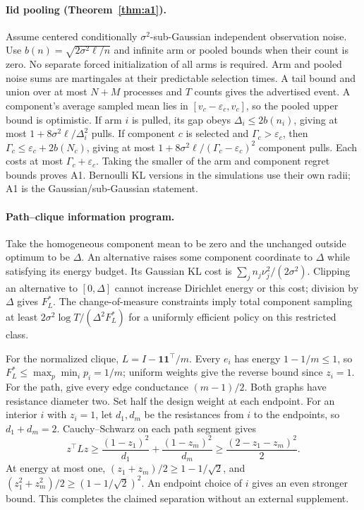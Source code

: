 \documentclass[sigconf,review,anonymous]{acmart}
\begin{document}
\paragraph{Iid pooling (Theorem~\ref{thm:a1}).}
Assume centered conditionally $\sigma^2$-sub-Gaussian independent observation noise. Use $b(n)=\sqrt{2\sigma^2\ell/n}$ and infinite arm or pooled bounds when their count is zero. No separate forced initialization of all arms is required. Arm and pooled noise sums are martingales at their predictable selection times. A tail bound and union over at most $N+M$ processes and $T$ counts gives the advertised event. A component's average sampled mean lies in $[v_c-\varepsilon_c,v_c]$, so the pooled upper bound is optimistic. If arm $i$ is pulled, its gap obeys $\Delta_i\le2b(n_i)$, giving at most $1+8\sigma^2\ell/\Delta_i^2$ pulls. If component $c$ is selected and $\Gamma_c>\varepsilon_c$, then $\Gamma_c\le\varepsilon_c+2b(N_c)$, giving at most $1+8\sigma^2\ell/(\Gamma_c-\varepsilon_c)^2$ component pulls. Each costs at most $\Gamma_c+\varepsilon_c$. Taking the smaller of the arm and component regret bounds proves A1. Bernoulli KL versions in the simulations use their own radii; A1 is the Gaussian/sub-Gaussian statement.

\paragraph{Path--clique information program.}
Take the homogeneous component mean to be zero and the unchanged outside optimum to be $\Delta$. An alternative raises some component coordinate to $\Delta$ while satisfying its energy budget. Its Gaussian KL cost is $\sum_j n_j\nu_j^2/(2\sigma^2)$. Clipping an alternative to $[0,\Delta]$ cannot increase Dirichlet energy or this cost; division by $\Delta$ gives $F_L^*$. The change-of-measure constraints imply total component sampling at least $2\sigma^2\log T/(\Delta^2F_L^*)$ for a uniformly efficient policy on this restricted class.

For the normalized clique, $L=I-\mathbf1\mathbf1^\top/m$. Every $e_i$ has energy $1-1/m\le1$, so $F_L^*\le\max_p\min_i p_i=1/m$; uniform weights give the reverse bound since $z_i=1$. For the path, give every edge conductance $(m-1)/2$. Both graphs have resistance diameter two. Set half the design weight at each endpoint. For an interior $i$ with $z_i=1$, let $d_1,d_m$ be the resistances from $i$ to the endpoints, so $d_1+d_m=2$. Cauchy--Schwarz on each path segment gives
\[
z^\top Lz\ge\frac{(1-z_1)^2}{d_1}+\frac{(1-z_m)^2}{d_m}
\ge\frac{(2-z_1-z_m)^2}{2}.
\]
At energy at most one, $(z_1+z_m)/2\ge1-1/\sqrt2$, and $(z_1^2+z_m^2)/2\ge(1-1/\sqrt2)^2$. An endpoint choice of $i$ gives an even stronger bound. This completes the claimed separation without an external supplement.
\end{document}
